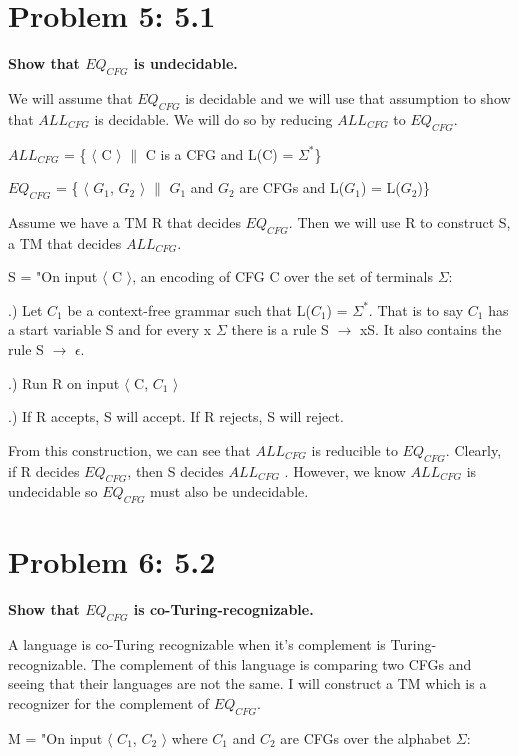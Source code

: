\documentclass[12pt]{article}
\begin{document}
\section*{Problem 5: 5.1}
{\bfseries Show that $EQ_{CFG}$ is undecidable.}

We will assume that $EQ_{CFG}$ is decidable and we will use that assumption to show that $ALL_{CFG}$ is decidable. We will do so by reducing $ALL_{CFG}$ to $EQ_{CFG}$.

 $ALL_{CFG}$ = \{ $\langle$ C $\rangle$ $\|$ C is a CFG and L(C) = $\Sigma^*$\}
  
  $EQ_{CFG}$ = \{ $\langle$ $G_1$, $G_2$ $\rangle$ $\|$ $G_1$ and $G_2$ are CFGs and L($G_1$) = L($G_2$)\}
 
Assume we have a TM R that decides $EQ_{CFG}$. Then we will use R to construct S, a TM that decides $ALL_{CFG}$. 

S = "On input $\langle$ C $\rangle$, an encoding of CFG C over the set of terminals $\Sigma$:
\setlength{\parindent}{5ex}

.) Let $C_1$ be a context-free grammar such that L($C_1$) = $\Sigma^*$. That is to say  $C_1$ has \indent a  start variable S and for every x \in $\Sigma$ there is a rule S $\xrightarrow{}$ xS. It also contains the rule \indent S $\xrightarrow{}$ $\epsilon$.

.) Run R on input $\langle$ C, $C_1$ $\rangle$

.) If R accepts, S will accept. If R rejects, S will reject.

\setlength{\parindent}{0ex}
From this construction, we can see that $ALL_{CFG}$ is reducible to $EQ_{CFG}$. Clearly, if R decides $EQ_{CFG}$, then S decides $ALL_{CFG}$ . However, we know $ALL_{CFG}$ is undecidable so $EQ_{CFG}$ must also be undecidable.

\section*{Problem 6: 5.2}
{\bfseries Show that $EQ_{CFG}$ is co-Turing-recognizable.}


A language is co-Turing recognizable when it's complement is Turing-recognizable. The complement of this language is comparing two CFGs and seeing that their languages are not the same. I will construct a TM which is a recognizer for the complement of $EQ_{CFG}$.

M = "On input $\langle$ $C_1$, $C_2$ $\rangle$ where $C_1$ and $C_2$ are CFGs over the alphabet $\Sigma$:
\setlength{\parindent}{5ex}
\end{document}
